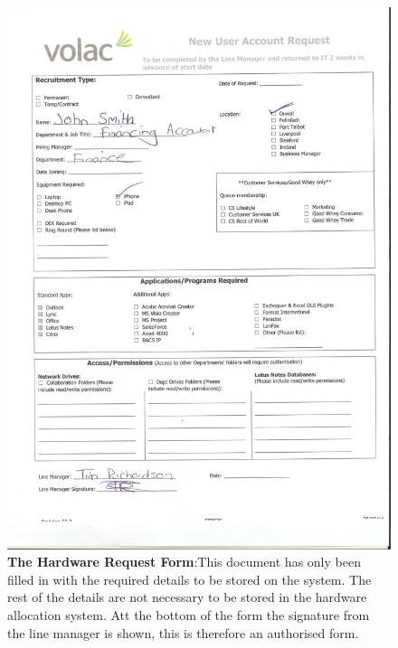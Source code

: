 \begin{figure}[H]
\includegraphics[width=.9\textwidth,height=.9\textheight,keepaspectratio]{HardwareRequestForm.jpg}
\caption{\textbf{The Hardware Request Form}:This document has only been filled in with the required details to be stored on the system. The rest of the details are not necessary to be stored in the hardware allocation system. Att the bottom of the form the signature from the line manager is shown, this is therefore an authorised form.} \label{HardwareRequestForm}
\end{figure}

